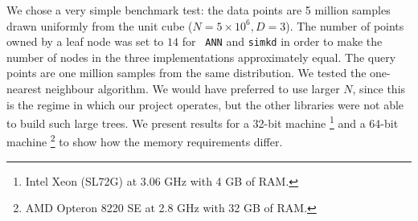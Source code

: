 We chose a very simple benchmark test: the data points are 5 million
samples drawn uniformly from the unit cube ($N=5 \times 10^6, D=3$).
The number of points owned by a leaf node was set to $14$ for {\tt
ANN} and {\tt simkd} in order to make the number of nodes in the three
implementations approximately equal.  The query points are one million
samples from the same distribution.  We tested the one-nearest
neighbour algorithm.  We would have preferred to use larger $N$, since
this is the regime in which our \an project operates, but the other
libraries were not able to build such large trees.  We present results
for a 32-bit machine%
\footnote{Intel Xeon (SL72G) at 3.06 GHz with 4 GB of RAM.}
and a 64-bit machine%
\footnote{AMD Opteron 8220 SE at 2.8 GHz with 32 GB of RAM.}
to show how the memory requirements differ.

